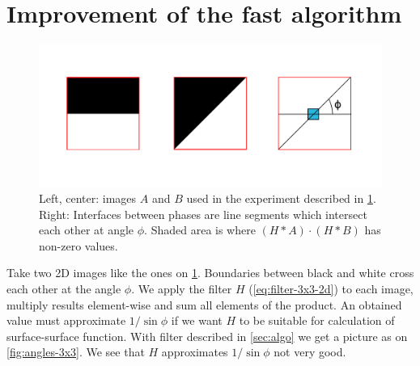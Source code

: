 \documentclass[reprint,amsmath,amssymb,aps,pre,showkeys,showpacs]{revtex4-1}
\begin{document}
\section{Improvement of the fast algorithm}
\label{sec:improvement}
\begin{figure}
  \centering
  \includegraphics[width=0.8\linewidth]{images/experiment-setup.png}
  \caption[]{Left, center: images $A$ and $B$ used in the experiment described
    in \cref{sec:improvement}. Right: Interfaces between phases are line
    segments which intersect each other at angle $\phi$. Shaded area is where
    $(H*A)\cdot(H*B)$ has non-zero values.}
  \label{fig:experiment-setup}
\end{figure}
Take two 2D images like the ones on \cref{fig:experiment-setup}. Boundaries
between black and white cross each other at the angle $\phi$. We apply the
filter $H$ (\cref{eq:filter-3x3-2d}) to each image, multiply results
element-wise and sum all elements of the product. An obtained value must
approximate $1/\sin \phi$ if we want $H$ to be suitable for calculation of
surface-surface function. With filter described in \cref{sec:algo} we get a
picture as on \cref{fig:angles-3x3}. We see that $H$ approximates
$1/\sin \phi$ not very good.
\end{document}
